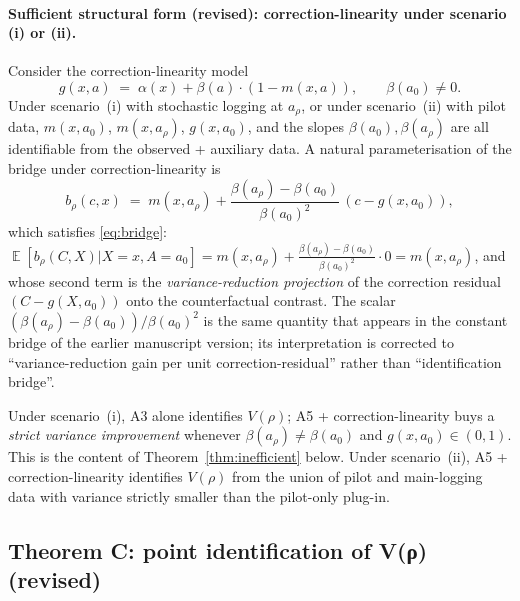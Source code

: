 \documentclass[11pt]{article}
\DeclareMathOperator{\E}{\mathbb{E}}
\begin{document}
\paragraph{Sufficient structural form (revised): correction-linearity
under scenario (i) or (ii).}  Consider the correction-linearity
model
\begin{equation}
g(x, a) \;=\; \alpha(x) + \beta(a) \cdot (1 - m(x, a)),\qquad \beta(a_0) \ne 0.
\label{eq:corr-linear}
\end{equation}
Under scenario~(i) with stochastic logging at $a_\rho$, or under
scenario~(ii) with pilot data, $m(x, a_0)$, $m(x, a_\rho)$,
$g(x, a_0)$, and the slopes $\beta(a_0), \beta(a_\rho)$ are all
identifiable from the observed + auxiliary data.  A natural
parameterisation of the bridge under correction-linearity is
\begin{equation}
b_\rho(c, x) \;=\; m(x, a_\rho) + \frac{\beta(a_\rho) - \beta(a_0)}{\beta(a_0)^2}\,(c - g(x, a_0)),
\label{eq:bridge-form}
\end{equation}
which satisfies \eqref{eq:bridge}:
$\E[b_\rho(C, X) | X = x, A = a_0] = m(x, a_\rho) + \frac{\beta(a_\rho) - \beta(a_0)}{\beta(a_0)^2}\cdot 0 = m(x, a_\rho)$,
and whose second term is the \emph{variance-reduction projection} of
the correction residual $(C - g(X, a_0))$ onto the counterfactual
contrast.  The scalar $(\beta(a_\rho) - \beta(a_0))/\beta(a_0)^2$
is the same quantity that appears in the constant bridge of the
earlier manuscript version; its interpretation is corrected to
``variance-reduction gain per unit correction-residual'' rather
than ``identification bridge''.

\begin{remark}
Under scenario~(i), A3 alone identifies $V(\rho)$; A5 +
correction-linearity buys a \emph{strict variance improvement}
whenever $\beta(a_\rho) \ne \beta(a_0)$ and $g(x, a_0) \in (0, 1)$.
This is the content of Theorem~\ref{thm:inefficient} below.  Under
scenario~(ii), A5 + correction-linearity identifies $V(\rho)$ from
the union of pilot and main-logging data with variance strictly
smaller than the pilot-only plug-in.
\end{remark}

\subsection{Theorem C: point identification of V(ρ) (revised)}
\end{document}
